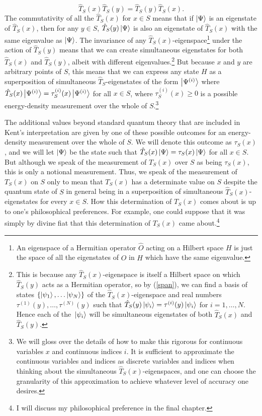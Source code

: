 $$\hat{T}_S(x)\hat{T}_S(y)=\hat{T}_S(y)\hat{T}_S(x).$$
The commutativity of all the $\hat{T}_S(x)$ for $x\in S$ means that if $\ket{\Psi}$ is an eigenstate of $\hat{T}_S(x)$, then for any $y\in S$, $\hat{T}_S(y)\ket{\Psi}$ is also an eigenstate of  $\hat{T}_S(x)$ with the same eigenvalue as $\ket{\Psi}$. The invariance of any $\hat{T}_S(x)$-eigenspace\footnote{An eigenspace of a Hermitian operator $\hat{O}$ acting on a Hilbert space $H$ is just the space of all the eigenstates of $\hat{O}$ in $H$ which have the same eigenvalue.} under the action of   $\hat{T}_S(y)$ means that we can create simultaneous eigenstates for both  $\hat{T}_S(x)$ and  $\hat{T}_S(y)$, albeit with different eigenvalues.\footnote{This is because any $\hat{T}_S(x)$-eigenspace is itself a Hilbert space on which $\hat{T}_S(y)$ acts as a Hermitian operator, so by (\ref{span}), we can find a basis of states $\{\ket{\psi_1},\ldots\ket{\psi_N}\}$ of the $\hat{T}_S(x)$-eigenspace and real numbers $\tau^{(1)}(y),\ldots,\tau^{(N)}(y)$ such that $\hat{T}_S(y)\ket*{\psi_i}=\tau^{(i)}(y)\ket*{\psi_i}$ for $i=1,\ldots,N.$ Hence each of the $\ket*{\psi_i}$ will be simultaneous eigenstates of both $\hat{T}_S(x)$ and $\hat{T}_S(y)$.} But because $x$ and $y$ are arbitrary points of $S$, this means that we can express any state $H$ as a superposition of simultaneous $\hat{T}_S$-eigenstates of the form $\ket{\Psi^{(i)}}$ where
  $\hat{T}_S(x)\ket{\Psi^{(i)}}=\tau^{(i)}_S(x)\ket{\Psi^{(i)}}$ for all $x\in S$, where $\tau^{(i)}_S(x)\geq 0$ is a possible energy-density measurement over the whole of $S$.\footnote{We will gloss over \label{glosssim}the details of how to make this rigorous for continuous variables $x$ and continuous indices $i$. It is sufficient to approximate the continuous variables and indices as discrete variables and indices when thinking about the simultaneous $\hat{T}_S(x)$-eigenspaces, and one can choose the granularity of this approximation to achieve whatever level of accuracy one desires.}\label{simultaneous}
  
The additional values beyond standard quantum theory that are included in Kent's interpretation are given by one of these possible outcomes for an energy-density measurement over the whole of $S$. We will denote this outcome as $\tau_S(x)$, and we will let $\ket{\Psi}$ be the state such that $\hat{T}_S(x)\ket{\Psi}=\tau_S(x)\ket{\Psi}$ for all $x\in S$. But although we speak of the measurement of $T_S(x)$ over $S$ as being $\tau_S(x)$, this is only a notional measurement. Thus, we speak of the measurement of  $T_S(x)$ on $S$ only to mean that $T_S(x)$ has a determinate value on $S$ despite the quantum state of $S$ in general being in a superposition of simultaneous $\hat{T}_S(x)$-eigenstates for every $x\in S$. How this determination of $T_S(x)$ comes about is up to one's philosophical preferences. For example, one could suppose that it was simply by divine fiat that this determination  of $T_S(x)$ came about.\footnote{I will discuss my philosophical preference in the final chapter.} 

